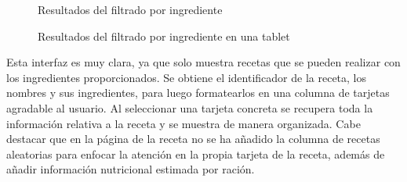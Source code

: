 \begin{figure}[h!]
\centering
{}
\caption{Resultados del filtrado por ingrediente}
\label{fig:resultados}
\end{figure}

\begin{figure}[h!]
\centering
{}
\caption{Resultados del filtrado por ingrediente en una tablet}
\label{fig:resultados-tablet}
\end{figure}

\newpage
Esta \gls{interfaz} es muy clara, ya que solo muestra recetas que se pueden realizar con los ingredientes proporcionados. Se obtiene el identificador de la receta, los nombres y sus ingredientes, para luego formatearlos en una columna de tarjetas agradable al usuario. Al seleccionar una tarjeta concreta se recupera toda la información relativa a la receta y se muestra de manera organizada. Cabe destacar que en la página de la receta no se ha añadido la columna de recetas aleatorias para enfocar la atención en la propia tarjeta de la receta, además de añadir información nutricional estimada por ración.

